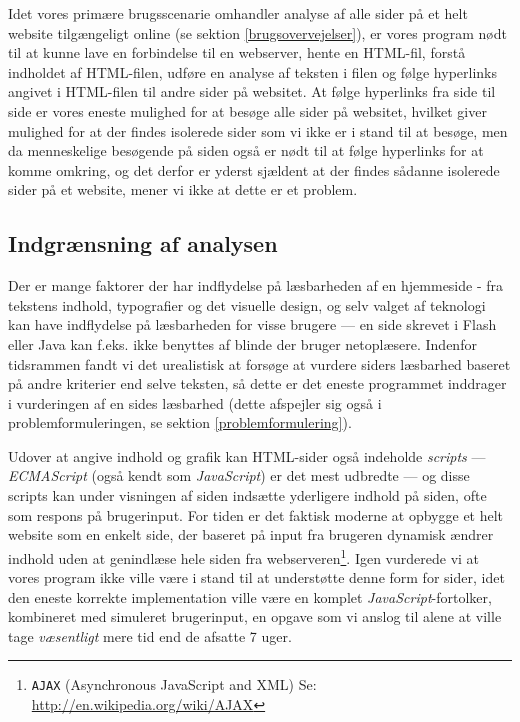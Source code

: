 \documentclass[a4paper,oneside]{memoir}
\begin{document}
Idet vores primære brugsscenarie omhandler analyse af alle sider på et
helt website tilgængeligt online (se sektion \ref{brugsovervejelser}),
er vores program nødt til at kunne lave en
forbindelse til en webserver, hente en HTML-fil, forstå indholdet af
HTML-filen, udføre en analyse af teksten i filen og følge hyperlinks
angivet i HTML-filen til andre sider på websitet. At følge hyperlinks
fra side til side er vores eneste mulighed for at besøge alle sider på
websitet, hvilket giver mulighed for at der findes isolerede sider som
vi ikke er i stand til at besøge, men da menneskelige besøgende på
siden også er nødt til at følge hyperlinks for at komme omkring, og
det derfor er yderst sjældent at der findes sådanne isolerede sider på et
website, mener vi ikke at dette er et problem.

\subsection{Indgrænsning af analysen}
\label{begraensning}
Der er mange faktorer der har indflydelse på læsbarheden af en
hjemmeside - fra tekstens indhold, typografier og det visuelle
design, og selv valget af teknologi kan have indflydelse på
læsbarheden for visse brugere --- en side skrevet i Flash eller Java
kan f.eks. ikke benyttes af blinde der bruger netoplæsere. Indenfor
tidsrammen fandt vi det urealistisk at forsøge at vurdere siders
læsbarhed baseret på andre kriterier end selve teksten, så dette er
det eneste programmet inddrager i vurderingen af en sides læsbarhed
(dette afspejler sig også i problemformuleringen, se sektion
\ref{problemformulering}).

Udover at angive indhold og grafik kan HTML-sider også indeholde
\textit{scripts} --- \textit{ECMAScript} (også kendt som
\textit{JavaScript}) er det mest udbredte --- og disse scripts kan
under visningen af siden indsætte yderligere indhold på siden, ofte
som respons på brugerinput. For tiden er det faktisk moderne at
opbygge et helt website som en enkelt side, der baseret på input fra
brugeren dynamisk ændrer indhold uden at genindlæse hele siden fra
webserveren\footnote{\texttt{AJAX} (Asynchronous JavaScript and XML) Se:
\url{http://en.wikipedia.org/wiki/AJAX}}. Igen vurderede vi at vores program
ikke ville være i stand til at understøtte denne form for sider, idet den eneste
korrekte implementation ville være en komplet
\textit{JavaScript}-fortolker, kombineret med simuleret brugerinput,
en opgave som vi anslog til alene at ville tage \textit{væsentligt}
mere tid end de afsatte 7 uger.
\end{document}
